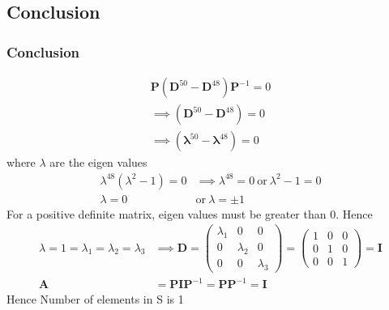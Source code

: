 \documentclass{beamer}
\providecommand{\brak}[1]{\ensuremath{\left(#1\right)}}
\theoremstyle{remark}
\newcommand{\myvec}[1]{\ensuremath{\begin{pmatrix}#1\end{pmatrix}}}
\let\vec\mathbf
\numberwithin{equation}{section}
\begin{document}
\subsection{Conclusion}
\begin{frame}
\frametitle{Conclusion}
  \begin{align}
   \vec{P}\brak{\vec{D}^{50}-\vec{D}^{48}}\vec{P}^{-1}=0 \\
   \implies \brak{\vec{D}^{50}-\vec{D}^{48}}=0\\
   \implies \brak{\vec{\lambda}^{50}-\vec{\lambda}^{48}}=0
 \end{align}
 where $\lambda$ are the eigen values
\begin{align}
    \lambda^{48}\brak{\lambda^2-1}=0&\implies
    \lambda^{48}=0\ \text{or}\ \lambda^{2}-1=0 \\
     \lambda=0\ &\text{or}\ \lambda=\pm1
\end{align}
For a positive definite matrix, eigen values must be greater than 0. Hence
\begin{align}
    \lambda=1=\lambda_1=\lambda_2=\lambda_3 &\implies \vec{D}=\myvec{\lambda_1&0&0\\0&\lambda_2&0\\0&0&\lambda_3}=\myvec{1&0&0\\0&1&0\\0&0&1}=\vec{I}\\
    \vec{A}&=\vec{P}\vec{I}\vec{P}^{-1}
    =\vec{P}\vec{P}^{-1}=\vec{I}
\end{align}
Hence Number of elements in S is 1
 \end{frame}
 
\end{document}
